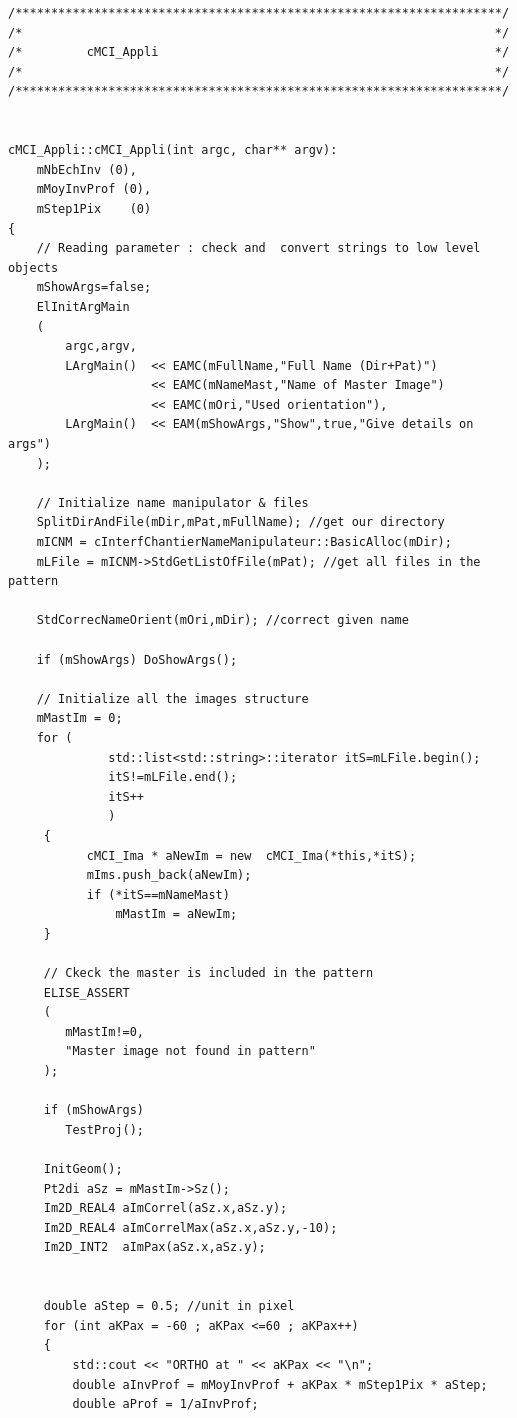 \begin{verbatim}
/********************************************************************/
/*                                                                  */
/*         cMCI_Appli                                               */
/*                                                                  */
/********************************************************************/


cMCI_Appli::cMCI_Appli(int argc, char** argv):
    mNbEchInv (0),
    mMoyInvProf (0),
    mStep1Pix    (0)
{
    // Reading parameter : check and  convert strings to low level objects
    mShowArgs=false;
    ElInitArgMain
    (
        argc,argv,
        LArgMain()  << EAMC(mFullName,"Full Name (Dir+Pat)")
                    << EAMC(mNameMast,"Name of Master Image")
                    << EAMC(mOri,"Used orientation"),
        LArgMain()  << EAM(mShowArgs,"Show",true,"Give details on args")
    );

    // Initialize name manipulator & files
    SplitDirAndFile(mDir,mPat,mFullName); //get our directory
    mICNM = cInterfChantierNameManipulateur::BasicAlloc(mDir);
    mLFile = mICNM->StdGetListOfFile(mPat); //get all files in the pattern

    StdCorrecNameOrient(mOri,mDir); //correct given name

    if (mShowArgs) DoShowArgs();

    // Initialize all the images structure
    mMastIm = 0;
    for (
              std::list<std::string>::iterator itS=mLFile.begin();
              itS!=mLFile.end();
              itS++
              )
     {
           cMCI_Ima * aNewIm = new  cMCI_Ima(*this,*itS);
           mIms.push_back(aNewIm);
           if (*itS==mNameMast)
               mMastIm = aNewIm;
     }

     // Ckeck the master is included in the pattern
     ELISE_ASSERT
     (
        mMastIm!=0,
        "Master image not found in pattern"
     );

     if (mShowArgs)
        TestProj();

     InitGeom();
     Pt2di aSz = mMastIm->Sz();
     Im2D_REAL4 aImCorrel(aSz.x,aSz.y);
     Im2D_REAL4 aImCorrelMax(aSz.x,aSz.y,-10);
     Im2D_INT2  aImPax(aSz.x,aSz.y);


     double aStep = 0.5; //unit in pixel
     for (int aKPax = -60 ; aKPax <=60 ; aKPax++)
     {
         std::cout << "ORTHO at " << aKPax << "\n";
         double aInvProf = mMoyInvProf + aKPax * mStep1Pix * aStep;
         double aProf = 1/aInvProf;


\end{verbatim}
